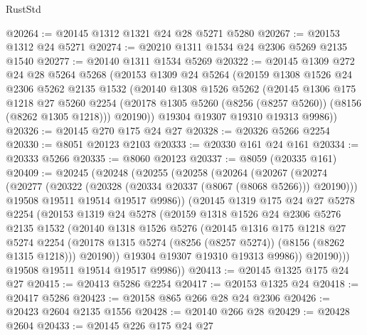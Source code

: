 \begin{lexlean}{RustStd}
\begin{coremodule}
{\begin{coremodule}
{{{{{{{{{{{{{{{{{{{{{{{{{{{{{{{{{{@20264 := @20145 @1312 @1321 @24 @28 @5271 @5280
@20267 := @20153 @1312 @24 @5271
@20274 := @20210 @1311 @1534 @24 @2306 @5269 @2135 @1540
@20277 := @20140 @1311 @1534 @5269
@20322 := @20145
    @1309
    @272
    @24
    @28
    @5264
    @5268
    (@20153
      @1309
      @24
      @5264
      (@20159
        @1308
        @1526
        @24
        @2306
        @5262
        @2135
        @1532
        (@20140
          @1308
          @1526
          @5262
          (@20145
            @1306
            @175
            @1218
            @27
            @5260
            @2254
            (@20178 @1305 @5260 (@8256 (@8257 @5260)) (@8156 (@8262 @1305 @1218)))
            @20190))
        @19304
        @19307
        @19310
        @19313
        @9986))
@20326 := @20145 @270 @175 @24 @27
@20328 := @20326 @5266 @2254
@20330 := @8051 @20123 @2103
@20333 := @20330 @161 @24 @161
@20334 := @20333 @5266
@20335 := @8060 @20123
@20337 := @8059 (@20335 @161)
@20409 := @20245
    (@20248
      (@20255
        (@20258
          (@20264
            (@20267
              (@20274
                (@20277 (@20322 (@20328 (@20334 @20337 (@8067 (@8068 @5266))) @20190)))
                @19508
                @19511
                @19514
                @19517
                @9986))
            (@20145
              @1319
              @175
              @24
              @27
              @5278
              @2254
              (@20153
                @1319
                @24
                @5278
                (@20159
                  @1318
                  @1526
                  @24
                  @2306
                  @5276
                  @2135
                  @1532
                  (@20140
                    @1318
                    @1526
                    @5276
                    (@20145
                      @1316
                      @175
                      @1218
                      @27
                      @5274
                      @2254
                      (@20178 @1315 @5274 (@8256 (@8257 @5274)) (@8156 (@8262 @1315 @1218)))
                      @20190))
                  @19304
                  @19307
                  @19310
                  @19313
                  @9986))
              @20190)))
        @19508
        @19511
        @19514
        @19517
        @9986))
@20413 := @20145 @1325 @175 @24 @27
@20415 := @20413 @5286 @2254
@20417 := @20153 @1325 @24
@20418 := @20417 @5286
@20423 := @20158 @865 @266 @28 @24 @2306
@20426 := @20423 @2604 @2135 @1556
@20428 := @20140 @266 @28
@20429 := @20428 @2604
@20433 := @20145 @226 @175 @24 @27
}}}}}}}}}}}}}}}}}}}}}}}}}}}}}}}}}}
\end{coremodule}}
\end{coremodule}
\end{lexlean}
